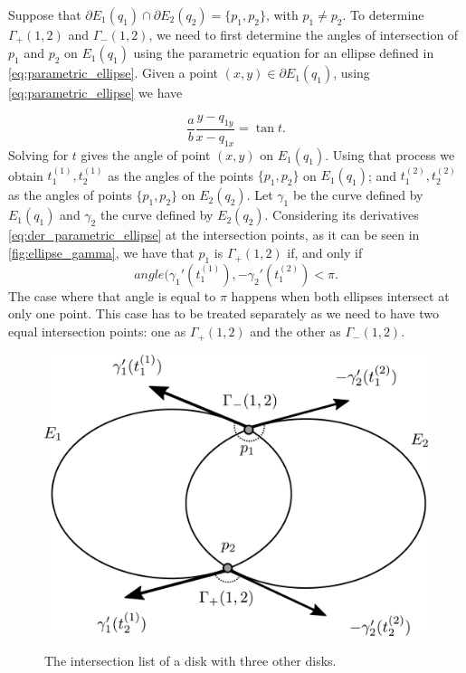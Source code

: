 Suppose that $\partial E_1(q_1) \cap \partial E_2(q_2) = \{p_1, p_2\}$, with $p_1 \neq p_2$. To determine $\Gamma_+(1,2)$ and $\Gamma_-(1,2)$, we need to first determine the angles of intersection of $p_1$ and $p_2$ on $E_1(q_1)$ using the parametric equation for an ellipse defined in \autoref{eq:parametric_ellipse}. Given a point $(x, y)\in \partial E_1(q_1)$, using \autoref{eq:parametric_ellipse} we have

\begin{equation*}
\dfrac{a}{b}\dfrac{y-q_{1y}}{x-q_{1x}} = \tan{t}.
\end{equation*}
Solving for $t$ gives the angle of point $(x,y)$ on $E_1(q_1)$. Using that process we obtain $t^{(1)}_1, t^{(1)}_2$ as the angles of the points $\{p_1, p_2\}$ on $E_1(q_1)$; and $t^{(2)}_1, t^{(2)}_2$ as the angles of points $\{p_1, p_2\}$ on $E_2(q_2)$.
Let $\gamma_1$ be the curve defined by $E_1(q_1)$ and $\gamma_2$ the curve defined by $E_2(q_2)$. Considering its derivatives \autoref{eq:der_parametric_ellipse} at the intersection points, as it can be seen in \autoref{fig:ellipse_gamma}, we have that $p_1$ is $\Gamma_+(1,2)$ if, and only if
\begin{equation*}
angle(\gamma_1'(t_1^{(1)}), -\gamma_2'(t_1^{(2)}) < \pi.
\end{equation*}
The case where that angle is equal to $\pi$ happens when both ellipses intersect at only one point. This case has to be treated separately as we need to have two equal intersection points: one as $\Gamma_+(1,2)$ and the other as $\Gamma_-(1,2)$.

\begin{figure}
	\centering
	
	\caption{The intersection list of a disk with three other disks.}
	\includegraphics[scale=.38]{tex/figures/ellipse_gamma.pdf}
	\fautor
	\label{fig:ellipse_gamma}
\end{figure}

